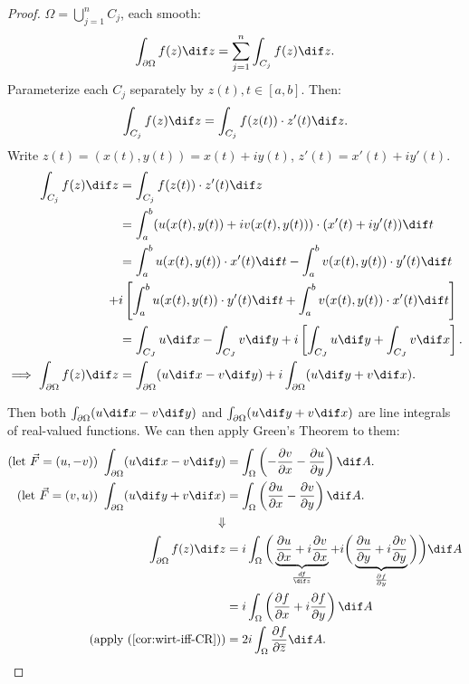 \begin{proof}
$\Omega = \bigcup_{j=1}^n C_j$, each smooth:
\begin{align*}
    \int_{\partial \Omega} f(z)  \dif z = \sum_{j=1}^n \int_{C_j} f(z) \dif z.
\end{align*}
Parameterize each $C_j$ separately by $z(t), t\in[a,b]$. Then:
\begin{align*}
\int_{C_j} f(z)  \dif z = \int_{C_j} f(z(t))\cdot z'(t)  \dif z.
\end{align*}
Write $z(t) = (x(t),y(t)) = x(t)+iy(t)$, $z'(t) = x'(t)+iy'(t)$.
\begin{align*}
\int_{C_j} f(z)  \dif z &= \int_{C_j} f(z(t))\cdot z'(t)  \dif z\\
&= \int_a^b (u(x(t),y(t)) + iv(x(t),y(t))) \cdot (x'(t)+iy'(t))  \dif t\\
&= \int_a^b u(x(t),y(t))\cdot x'(t) \dif t - \int_a^b v(x(t),y(t)) \cdot y'(t)  \dif t \\ +&i \left[ \int_a^b u(x(t),y(t))\cdot y'(t) \dif t +  \int_a^b v(x(t),y(t))\cdot x'(t) \dif t  \right]\\
&= \int_{C_J} u \dif x - \int_{C_J} v \dif y + i \left[ \int_{C_J} u \dif y + \int_{C_J} v \dif x \right]. \\
\implies \int_{\partial \Omega} f(z)  \dif z &= \int_{\partial \Omega} (u \dif x-v \dif y) + i\int_{\partial \Omega} (u \dif y+v \dif x).
\end{align*}

Then both $\int_{\partial \Omega} (u \dif x-v \dif y)$ and $\int_{\partial \Omega} (u \dif y+v \dif x)$ are line integrals of real-valued functions. We can then apply Green's Theorem to them:
\begin{align*}
    \text{(let $\Vec{F} = (u,-v)$) }\int_{\partial \Omega} (u \dif x-v \dif y) &= \int_\Omega \left( -\frac{\partial v}{\partial x} - \frac{\partial u}{\partial y}  \right)  \dif A.\\
    \text{(let $\Vec{F} = (v,u)$) }\int_{\partial \Omega} (u \dif y+v \dif x) &= \int_\Omega \left( \frac{\partial u}{\partial x} - \frac{\partial v}{\partial y}  \right)  \dif A.\\
    \Downarrow\\
    \int_{\partial \Omega} f(z) \dif z &= i\int_\Omega \bigg(  \underbrace{\frac{\partial u}{\partial x} + i \frac{\partial v}{\partial x}}_{\frac{df}{ \dif z}} + i \bigg( \underbrace{  \frac{\partial u}{\partial y} + i \frac{\partial v}{\partial y}}_{\frac{\partial f}{\partial y}} \bigg)\bigg) \dif A\\
    &= i \int_\Omega \left( \frac{\partial f}{\partial x} + i\frac{\partial f}{\partial y} \right)  \dif A\\
   \text{(apply (\ref{cor:wirt-iff-CR}))} &= 2i \int_\Omega \frac{\partial f}{\partial \overline{z}}  \dif A.\\
\end{align*}

\end{proof}

